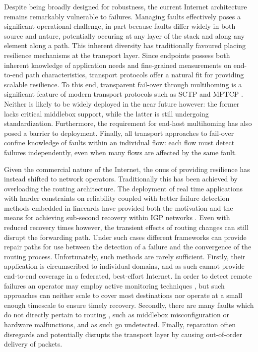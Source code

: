 Despite being broadly designed for robustness, the current Internet architecture remains remarkably vulnerable to failures.
Managing faults effectively poses a significant operational challenge, in part because faults differ widely in both source and nature, potentially occuring at any layer of the stack and along any element along a path.
This inherent diversity has traditionally favoured placing resilience mechanisms at the transport layer.
Since endpoints possess both inherent knowledge of application needs and fine-grained measurements on end-to-end path characteristics, transport protocols offer a natural fit for providing scalable resilience.
To this end, transparent fail-over through multihoming is a significant feature of modern transport protocols such as SCTP \cite{rfc4960} and MPTCP \cite{Wischik:2008p137}.
Neither is likely to be widely deployed in the near future however: the former lacks critical middlebox support, while the latter is still undergoing standardization.
Furthermore, the requirement for end-host multihoming has also posed a barrier to deployment.
Finally, all transport approaches to fail-over confine knowledge of faults within an individual flow: each flow must detect failures independently, even when many flows are affected by the same fault.

Given the commercial nature of the Internet, the onus of providing resilience has instead shifted to network operators.
Traditionally this has been achieved by overloading the routing architecture.
The deployment of real time applications with harder constraints on reliability coupled with better failure detection methods embedded in linecards have provided both the motivation and the means for achieving sub-second recovery within IGP networks \cite{Francois:2005p514}.
Even with reduced recovery times however, the transient effects of routing changes can still disrupt the forwarding path. 
Under such cases different frameworks \cite{Bryant:2007p522,Torvi:2008p518,Lor:2010:PRE:1868447.1868449} can provide repair paths for use between the detection of a failure and the convergence of the routing process.
Unfortunately, such methods are rarely sufficient.
Firstly, their application is circumscribed to individual domains, and as such cannot provide end-to-end coverage in a federated, best-effort Internet. 
In order to detect remote failures an operator may employ active monitoring techniques \cite{DBLP:conf/im/FokLMLLCC13}, but such approaches can neither scale to cover most destinations nor operate at a small enough timescale to ensure timely recovery.
Secondly, there are many faults which do not directly pertain to routing \cite{Turner:2010:CFL:2043164.1851220}, such as middlebox misconfiguration or hardware malfunctions, and as such go undetected.
Finally, reparation often disregards and potentially disrupts the transport layer by causing out-of-order delivery of packets.

